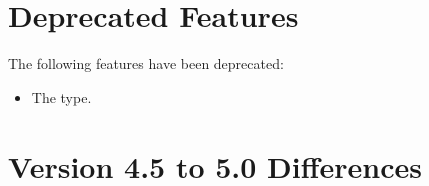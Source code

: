 \section{Deprecated Features}
\label{chap:Deprecated Features}

The following features have been deprecated:

\begin{itemize}
\item The  type.
\end{itemize}



\section{Version 4.5 to 5.0 Differences}
\label{sec:Version 4.5 to 5.0 Differences}


